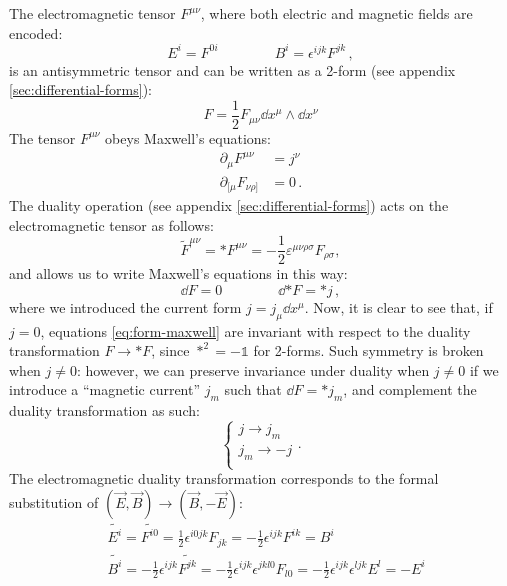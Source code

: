 \documentclass[main.tex]{subfiles}
\begin{document}
The electromagnetic tensor $F^{\mu \nu}$, where both electric and magnetic fields are encoded:
%
\begin{equation}
E^i=F^{0i} \qquad \qquad B^i=\epsilon^{ijk}F^{jk}\,,
\end{equation}
%
is an antisymmetric tensor and can be written as a 2-form (see appendix \ref{sec:differential-forms}): 
%
\begin{equation}
F = \frac{1}{2} F_{\mu\nu}\dd{x^\mu} \wedge \dd{x^\nu}
\end{equation}
%
The tensor $F^{\mu \nu}$ obeys Maxwell's equations:
%
\begin{subequations} \label{Maxwell}
\begin{align}
\partial_{\mu}F^{\mu \nu}&= j^\nu \label{maxwell-nonhom} \\
\partial_{[\mu} F_{\nu\rho]} &=0 \label{maxwell-hom} \,.
\end{align}
\end{subequations}
The duality operation (see appendix \ref{sec:differential-forms}) acts on the electromagnetic tensor as follows: 
\begin{equation}
\tilde{F}^{\mu\nu}=*F^{\mu\nu}=-\frac{1}{2}\varepsilon^{\mu \nu \rho \sigma}F_{\rho \sigma},
\end{equation}
%
%
and allows us to write Maxwell's equations in this way: 
%
\begin{equation} \label{eq:form-maxwell}
    \dd{F} = 0 \qquad  \qquad \dd{*F} = * j\,,
\end{equation}
%
where we introduced the current form $j = j_\mu \dd{x^\mu}$.
%
Now, it is clear to see that, if $j=0$, equations \ref{eq:form-maxwell} are invariant with respect to the duality transformation $F \rightarrow *F$, since $*^2 = -\mathbb{1}$ for 2-forms. Such symmetry is broken when $j\neq 0$: however, we can preserve invariance under duality when $j\neq 0$ if we introduce a ``magnetic current'' $j_m$ such that $\dd{F} = *j_m$, and complement the duality transformation as such:
\begin{equation}
\begin{cases}
j \rightarrow j_m \\
j_m \rightarrow -j \\
\end{cases}.
\end{equation}
%
The electromagnetic duality transformation corresponds to the formal substitution of $(\vec E,\vec B)\to(\vec B,-\vec E)$:
%
\begin{subequations}
\begin{align}
&\tilde{E^i}=\tilde{F^{i0}}=\frac{1}{2}\epsilon^{i0jk}F_{jk}=-\frac{1}{2}\epsilon^{ijk}F^{ik}=B^i\\
&\tilde{B^i}=-\frac{1}{2}\epsilon^{ijk}\tilde{F^{jk}}=-\frac{1}{2}\epsilon^{ijk}\epsilon^{jkl0}F_{l0}=-\frac{1}{2}\epsilon^{ijk}\epsilon^{ljk}E^l=-E^i
\end{align}
\end{subequations}
\end{document}
